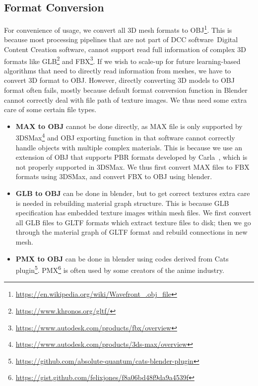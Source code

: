 \subsection{Format Conversion}
\label{sec:datasets:preprocess:conversion}

For convenience of usage, we convert all 3D mesh formats to OBJ\footnote{\url{https://en.wikipedia.org/wiki/Wavefront_.obj_file}}. 
This is because most processing pipelines that are not part of DCC software~\ie Digital Content Creation software, cannot support read full information of complex 3D formats like GLB\footnote{\url{https://www.khronos.org/gltf/}} and FBX\footnote{\url{https://www.autodesk.com/products/fbx/overview}}. 
If we wish to scale-up for future learning-based algorithms that need to directly read information from meshes, 
we have to convert 3D format to OBJ. 
However, directly converting 3D models to OBJ format often fails, 
mostly because default format conversion function in Blender cannot correctly deal with file path of texture images. 
We thus need some extra care of some certain file types.
\begin{itemize}
    \item \textbf{MAX to OBJ} cannot be done directly, as MAX file is only supported by 3DSMax\footnote{\url{https://www.autodesk.com/products/3ds-max/overview}} and OBJ exporting function in that software cannot correctly handle objects with multiple complex materials. 
    This is because we use an extension of OBJ that supports PBR formats developed by Carla~\cite{dosovitskiy2017carla}, which is not properly supported in 3DSMax. 
    We thus first convert MAX files to FBX formats using 3DSMax, and convert FBX to OBJ using blender. 
    \item \textbf{GLB to OBJ} can be done in blender, but to get correct textures extra care is needed in rebuilding material graph structure. 
    This is because GLB specification has embedded texture images within mesh files.
    We first convert all GLB files to GLTF formats which extract texture files to disk; 
    then we go through the material graph of GLTF format and rebuild connections in new mesh.  
    \item \textbf{PMX to OBJ} can be done in blender using codes derived from Cats plugin\footnote{\url{https://github.com/absolute-quantum/cats-blender-plugin}}. PMX\footnote{\url{https://gist.github.com/felixjones/f8a06bd48f9da9a4539f}} is often used by some creators of the anime industry.
\end{itemize}


